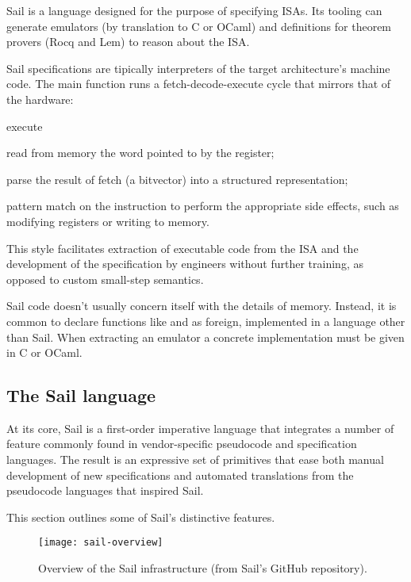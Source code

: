 Sail \cite{Armstrong} is a language designed for the purpose of specifying ISAs. Its tooling can generate emulators (by translation to C or OCaml) and definitions for theorem provers (\eg Rocq and Lem) to reason about the ISA.

Sail specifications are tipically interpreters of the target architecture's machine code. The main function runs a fetch-decode-execute cycle that mirrors that of the hardware:
\begin{labeling}[~--]{execute}
\item[fetch] read from memory the word pointed to by the  register;
\item[decode] parse the result of fetch (a bitvector) into a structured representation;
\item[execute] pattern match on the instruction to perform the appropriate side effects, such as modifying registers or writing to memory.
\end{labeling}

This style facilitates extraction of executable code from the ISA and the development of the specification by engineers without further training, as opposed to \eg custom small-step semantics.

Sail code doesn't usually concern itself with the details of memory. Instead, it is common to declare functions like  and  as foreign, \ie implemented in a language other than Sail. When extracting an emulator a concrete implementation must be given in C or OCaml.

\subsection{The Sail language}

At its core, Sail is a first-order imperative language that integrates a number of feature commonly found in vendor-specific pseudocode and specification languages. The result is an expressive set of primitives that ease both manual development of new specifications and automated translations from the pseudocode languages that inspired Sail.

This section outlines some of Sail's distinctive features.

\begin{figure}
  \centering
  \texttt{[image: sail-overview]}
  \caption{Overview of the Sail infrastructure (from Sail's GitHub repository).}
  \label{fig:sail-overview}
\end{figure}

